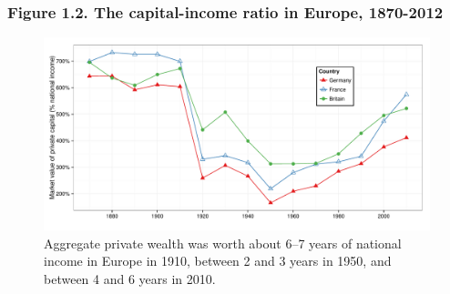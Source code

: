\documentclass[t]{beamer}\usepackage[]{graphicx}\usepackage[]{color}
\newenvironment{knitrout}{}{} %
\begin{document}
\begin{frame}[label=Fig12,fragile]
\frametitle{Figure 1.2. The capital-income ratio in Europe, 1870-2012}
\begin{figure}[t]
\begin{minipage}[b]{\textwidth}
\centering
\begin{knitrout}\footnotesize
{}\color{fgcolor}

{\centering \includegraphics[width=1\linewidth]{figures/color/Figure_1_2} 

}



\end{knitrout}
\caption{Aggregate private wealth was worth about 6--7 years of national income in Europe in 1910, between 2 and 3 years in 1950, and between 4 and 6 years in 2010.}
\end{minipage}
\end{figure}
\end{frame}
\end{document}
